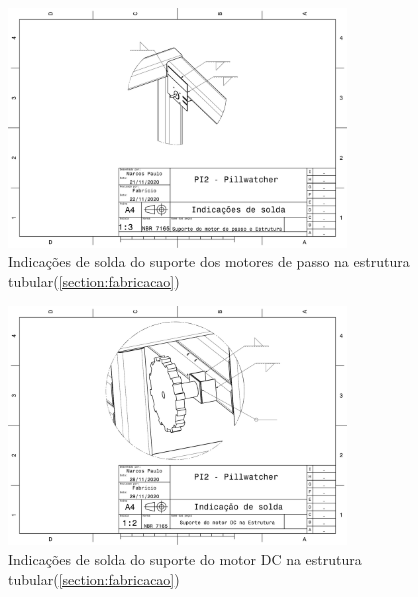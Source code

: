 \begin{apendicesenv}
\begin{figure}[H]
    \centering
    \includegraphics[width=0.8\textwidth]{figuras/estrutura/Desenhos/Solda_Suporte_MotorPasso.pdf}
    \caption{Indicações de solda do suporte dos motores de passo na estrutura tubular(\ref{section:fabricacao})}
    \label{fig:Solda_Supp_MotorPasso}
\end{figure}

\begin{figure}[H]
    \centering
    \includegraphics[width=0.8\textwidth]{figuras/estrutura/Desenhos/Solda_Suporte_MotorDC.pdf}
    \caption{Indicações de solda do suporte do motor DC na estrutura tubular(\ref{section:fabricacao})}
    \label{fig:Solda_Supp_MotorDC}
\end{figure}


\end{apendicesenv}
